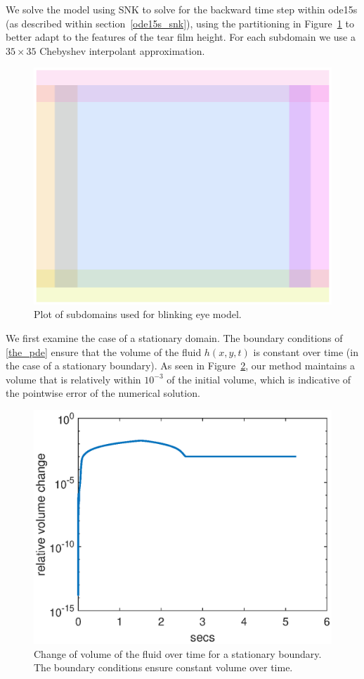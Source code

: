 We solve the model using SNK to solve for the backward time step within ode15s (as described within section~\ref{ode15s_snk}), using the partitioning in Figure~\ref{eye_partition} to better adapt to the features of the tear film height. For each subdomain we use a $35 \times 35$ Chebyshev interpolant approximation.
\begin{figure}
	\centering
	\includegraphics[scale=0.6]{Chapter4/Eye_domains}
	\caption{Plot of subdomains used for blinking eye model.}
	\label{eye_partition}
\end{figure}

We first examine the case of a stationary domain. The boundary conditions of \ref{the_pde} ensure that the volume of the fluid $h(x,y,t)$ is constant over time (in the case of a stationary boundary). As seen in Figure~\ref{eye_volume}, our method maintains a volume that is relatively within $10^{-3}$ of the initial volume, which is indicative of the pointwise error of the numerical solution.

\begin{figure}
	\centering
	\includegraphics[scale=0.8]{Chapter4/stationary_volume_change}
	\caption{Change of volume of the fluid over time for a stationary boundary. The boundary conditions ensure constant volume over time.}
	\label{eye_volume}
\end{figure}

